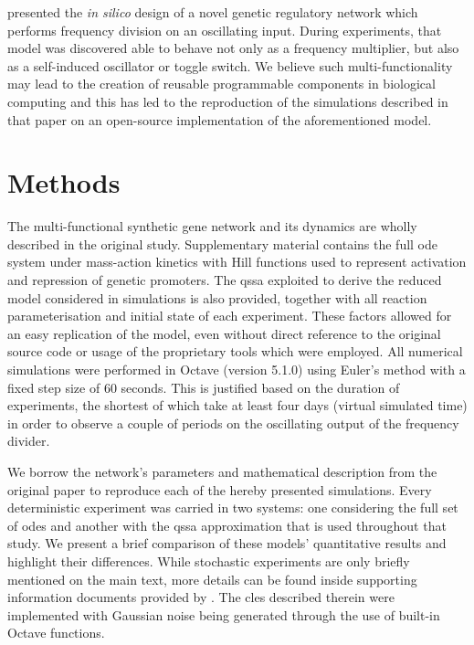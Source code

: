   \citet{originals} presented the \textit{in silico} design of a novel genetic regulatory network which performs frequency division on an oscillating input.
  During experiments, that model was discovered able to behave not only as a frequency multiplier, but also as a self-induced oscillator or toggle switch.
  We believe such multi-functionality may lead to the creation of reusable programmable components in biological computing and this has led to the reproduction of the simulations described in that paper on an open-source implementation of the aforementioned model.


\section{Methods}

  The multi-functional synthetic gene network and its dynamics are wholly described in the original study.
  Supplementary material contains the full \ac{ode} system under mass-action kinetics with Hill functions used to represent activation and repression of genetic promoters.
  The \ac{qssa} exploited to derive the reduced model considered in simulations is also provided, together with all reaction parameterisation and initial state of each experiment.
  These factors allowed for an easy replication of the model, even without direct reference to the original source code or usage of the proprietary tools which were employed.
  All numerical simulations were performed in Octave (version 5.1.0) using Euler's method with a fixed step size of 60 seconds.
  This is justified based on the duration of experiments, the shortest of which take at least four days (virtual simulated time) in order to observe a couple of periods on the oscillating output of the frequency divider.

  We borrow the network's parameters and mathematical description from the original paper to reproduce each of the hereby presented simulations.
  Every deterministic experiment was carried in two systems: one considering the full set of \ac{ode}s and another with the \ac{qssa} approximation that is used throughout that study.
  We present a brief comparison of these models' quantitative results and highlight their differences.
  While stochastic experiments are only briefly mentioned on the main text, more details can be found inside supporting information documents provided by \citet{originals}.
  The \ac{cles} described therein were implemented with Gaussian noise being generated through the use of built-in Octave functions.


